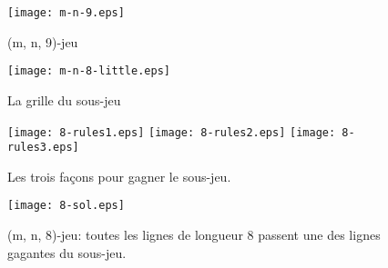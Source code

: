 \documentclass[12pt, a4paper]{article}
\begin{document}
\begin{figure}[h]
    \centering
    \texttt{[image: m-n-9.eps]}
    \caption{(m, n, 9)-jeu}
    \label{fig:m-n-9}
\end{figure}

\begin{figure}[h]
    \centering
    \texttt{[image: m-n-8-little.eps]}
    \caption{La grille du sous-jeu}
    \label{fig:sous-jeu}
\end{figure}

\begin{figure}[h]
    \centering
    \texttt{[image: 8-rules1.eps]}
    \texttt{[image: 8-rules2.eps]}
    \texttt{[image: 8-rules3.eps]}
    \caption{Les trois façons pour gagner le sous-jeu.}
    \label{fig:regle}
\end{figure}

\begin{figure}[h]
    \centering
    \texttt{[image: 8-sol.eps]}
    \caption{(m, n, 8)-jeu:
    toutes les lignes de longueur 8 passent une des lignes gagantes du sous-jeu.}
    \label{fig:m-n-8}
\end{figure}
\end{document}
